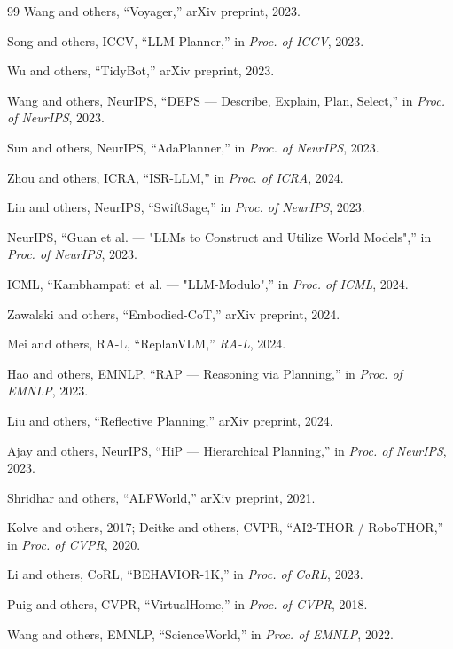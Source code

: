 \documentclass[10pt,twocolumn]{ICCAS}
\begin{document}
\begin{thebibliography}{99}
Wang and others, ``Voyager,'' arXiv preprint, 2023.

Song and others, ICCV, ``LLM-Planner,'' in \textit{Proc. of ICCV}, 2023.

Wu and others, ``TidyBot,'' arXiv preprint, 2023.

Wang and others, NeurIPS, ``DEPS — Describe, Explain, Plan, Select,'' in \textit{Proc. of NeurIPS}, 2023.

Sun and others, NeurIPS, ``AdaPlanner,'' in \textit{Proc. of NeurIPS}, 2023.

Zhou and others, ICRA, ``ISR-LLM,'' in \textit{Proc. of ICRA}, 2024.

Lin and others, NeurIPS, ``SwiftSage,'' in \textit{Proc. of NeurIPS}, 2023.

NeurIPS, ``Guan et al. — "LLMs to Construct and Utilize World Models",'' in \textit{Proc. of NeurIPS}, 2023.

ICML, ``Kambhampati et al. — "LLM-Modulo",'' in \textit{Proc. of ICML}, 2024.

Zawalski and others, ``Embodied-CoT,'' arXiv preprint, 2024.

Mei and others, RA-L, ``ReplanVLM,'' \textit{RA-L}, 2024.

Hao and others, EMNLP, ``RAP — Reasoning via Planning,'' in \textit{Proc. of EMNLP}, 2023.

Liu and others, ``Reflective Planning,'' arXiv preprint, 2024.

Ajay and others, NeurIPS, ``HiP — Hierarchical Planning,'' in \textit{Proc. of NeurIPS}, 2023.

Shridhar and others, ``ALFWorld,'' arXiv preprint, 2021.

Kolve and others, 2017; Deitke and others, CVPR, ``AI2-THOR / RoboTHOR,'' in \textit{Proc. of CVPR}, 2020.

Li and others, CoRL, ``BEHAVIOR-1K,'' in \textit{Proc. of CoRL}, 2023.

Puig and others, CVPR, ``VirtualHome,'' in \textit{Proc. of CVPR}, 2018.

Wang and others, EMNLP, ``ScienceWorld,'' in \textit{Proc. of EMNLP}, 2022.
\end{thebibliography}
%
\end{document}

